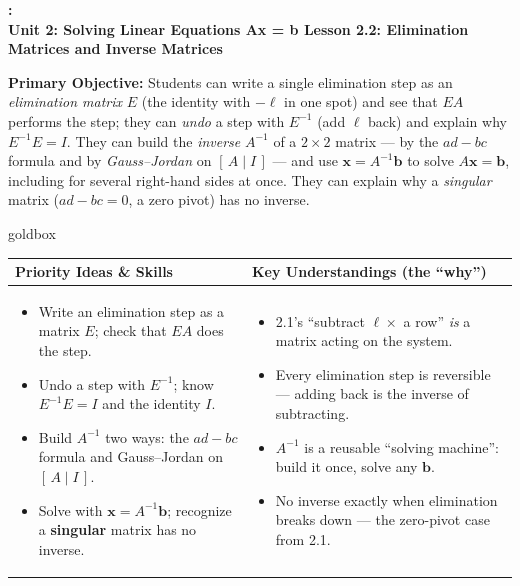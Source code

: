 \documentclass[10pt]{article}
\newcommand{\xx}{\mathbf{x}}
\newcommand{\bb}{\mathbf{b}}
\newcommand{\UnitNumberName}{Unit 2: Solving Linear Equations Ax = b \quad}
\newcommand{\LessonNumberName}{Lesson 2.2: Elimination Matrices and Inverse Matrices}
\begin{document}
\begin{center}
    {\Large\bfseries \CourseName: \SchoolYear \\
    {\small\bfseries \UnitNumberName \LessonNumberName}}
\end{center}

\begin{tcolorbox}[colback=blush, colframe=burgundy, boxrule=0.9pt, arc=2mm,
    left=2mm, right=2mm, top=1.5mm, bottom=1.5mm]
    \textbf{Primary Objective:} Students can write a single elimination step as an
    \emph{elimination matrix} $E$ (the identity with $-\ell$ in one spot) and see that $EA$
    performs the step; they can \emph{undo} a step with $E^{-1}$ (add $\ell$ back) and explain why
    $E^{-1}E=I$. They can build the \emph{inverse} $A^{-1}$ of a $2\times 2$ matrix --- by the
    $ad-bc$ formula and by \emph{Gauss--Jordan} on $[\,A\mid I\,]$ --- and use $\xx=A^{-1}\bb$ to
    solve $A\xx=\bb$, including for several right-hand sides at once. They can explain why a
    \emph{singular} matrix ($ad-bc=0$, a zero pivot) has no inverse.
\end{tcolorbox}

\renewcommand{\arraystretch}{1.4}
\begin{skillbox}{goldbox}
\begin{tabularx}{\linewidth}{@{}X|X@{}}
\textbf{Priority Ideas \& Skills} & \textbf{Key Understandings (the ``why'')} \\[2pt]
\hline
\vspace{-6pt}
\begin{itemize}[leftmargin=1.1em, nosep, after=\vspace{2pt}]
  \item Write an elimination step as a matrix $E$; check that $EA$ does the step.
  \item Undo a step with $E^{-1}$; know $E^{-1}E=I$ and the identity $I$.
  \item Build $A^{-1}$ two ways: the $ad-bc$ formula and Gauss--Jordan on $[\,A\mid I\,]$.
  \item Solve with $\xx=A^{-1}\bb$; recognize a \textbf{singular} matrix has no inverse.
\end{itemize}
&
\vspace{-6pt}
\begin{itemize}[leftmargin=1.1em, nosep, after=\vspace{2pt}]
  \item 2.1's ``subtract $\ell\times$ a row'' \emph{is} a matrix acting on the system.
  \item Every elimination step is reversible --- adding back is the inverse of subtracting.
  \item $A^{-1}$ is a reusable ``solving machine'': build it once, solve any $\bb$.
  \item No inverse exactly when elimination breaks down --- the zero-pivot case from 2.1.
\end{itemize}
\end{tabularx}
\end{skillbox}
\end{document}
